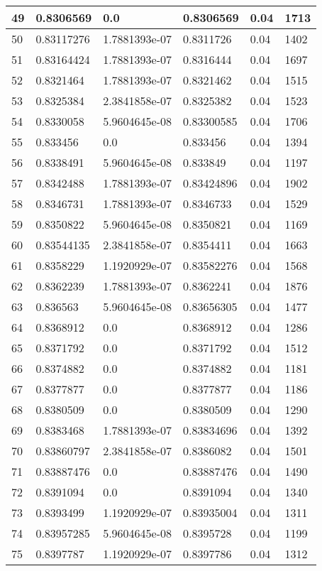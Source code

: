 \begin{longtable}{|l|l|l|l|l|l|}
49 & 0.8306569 & 0.0 & 0.8306569 & 0.04 & 1713 \\ \hline 
50 & 0.83117276 & 1.7881393e-07 & 0.8311726 & 0.04 & 1402 \\ \hline 
51 & 0.83164424 & 1.7881393e-07 & 0.8316444 & 0.04 & 1697 \\ \hline 
52 & 0.8321464 & 1.7881393e-07 & 0.8321462 & 0.04 & 1515 \\ \hline 
53 & 0.8325384 & 2.3841858e-07 & 0.8325382 & 0.04 & 1523 \\ \hline 
54 & 0.8330058 & 5.9604645e-08 & 0.83300585 & 0.04 & 1706 \\ \hline 
55 & 0.833456 & 0.0 & 0.833456 & 0.04 & 1394 \\ \hline 
56 & 0.8338491 & 5.9604645e-08 & 0.833849 & 0.04 & 1197 \\ \hline 
57 & 0.8342488 & 1.7881393e-07 & 0.83424896 & 0.04 & 1902 \\ \hline 
58 & 0.8346731 & 1.7881393e-07 & 0.8346733 & 0.04 & 1529 \\ \hline 
59 & 0.8350822 & 5.9604645e-08 & 0.8350821 & 0.04 & 1169 \\ \hline 
60 & 0.83544135 & 2.3841858e-07 & 0.8354411 & 0.04 & 1663 \\ \hline 
61 & 0.8358229 & 1.1920929e-07 & 0.83582276 & 0.04 & 1568 \\ \hline 
62 & 0.8362239 & 1.7881393e-07 & 0.8362241 & 0.04 & 1876 \\ \hline 
63 & 0.836563 & 5.9604645e-08 & 0.83656305 & 0.04 & 1477 \\ \hline 
64 & 0.8368912 & 0.0 & 0.8368912 & 0.04 & 1286 \\ \hline 
65 & 0.8371792 & 0.0 & 0.8371792 & 0.04 & 1512 \\ \hline 
66 & 0.8374882 & 0.0 & 0.8374882 & 0.04 & 1181 \\ \hline 
67 & 0.8377877 & 0.0 & 0.8377877 & 0.04 & 1186 \\ \hline 
68 & 0.8380509 & 0.0 & 0.8380509 & 0.04 & 1290 \\ \hline 
69 & 0.8383468 & 1.7881393e-07 & 0.83834696 & 0.04 & 1392 \\ \hline 
70 & 0.83860797 & 2.3841858e-07 & 0.8386082 & 0.04 & 1501 \\ \hline 
71 & 0.83887476 & 0.0 & 0.83887476 & 0.04 & 1490 \\ \hline 
72 & 0.8391094 & 0.0 & 0.8391094 & 0.04 & 1340 \\ \hline 
73 & 0.8393499 & 1.1920929e-07 & 0.83935004 & 0.04 & 1311 \\ \hline 
74 & 0.83957285 & 5.9604645e-08 & 0.8395728 & 0.04 & 1199 \\ \hline 
75 & 0.8397787 & 1.1920929e-07 & 0.8397786 & 0.04 & 1312 \\ \hline 
\end{longtable}